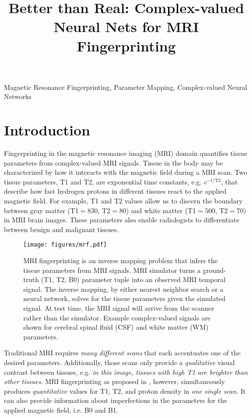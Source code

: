 \documentclass{article}
\title{Better than Real: Complex-valued Neural Nets for MRI Fingerprinting}
\begin{document}
\maketitle

\begin{abstract}

\end{abstract}

\begin{keywords}
Magnetic Resonance Fingerprinting, Parameter Mapping, 
Complex-valued Neural Networks
\end{keywords}

\section{Introduction}
\label{sec:intro}


Fingerprinting in the magnetic resonance imaging (MRI) domain \cite{mrf_nature} quantifies tissue parameters from complex-valued MRI signals. 
Tissue in the body may be characterized by how it interacts with the magnetic field during a MRI scan. Two tissue parameters, T1 and T2, are exponential time constants, e.g. $e^{-t/\text{T}2}$, that describe how fast hydrogen protons in different tissues react to the applied magnetic field. For example, T1 and T2 values allow us to discern the boundary between gray matter (T1$=830$, T2$=80$) and white matter (T1$=500$, T2$=70$) in MRI brain images. These parameters also enable radiologists to differentiate between benign and malignant tissues.

\begin{figure}[t]
	\texttt{[image: figures/mrf.pdf]}
	\label{fig:mrf}
	\caption{MRI fingerprinting is an inverse mapping problem that infers the tissue parameters from MRI signals. MRI simulator turns a ground-truth (T1, T2, B0) parameter tuple into an observed MRI temporal signal. The inverse mapping, by either nearest neighbor search or a neural network, solves for the tissue parameters given the simulated signal. At test time, the MRI signal will arrive from the scanner rather than the simulator.  Example complex-valued signals are shown for cerebral spinal fluid (CSF) and white matter (WM) parameters. }
\end{figure}

Traditional MRI requires {\it many different scans} that each accentuates one of the desired parameters. Additionally, those scans only provide a {\it qualitative} visual contrast between tissues, e.g. {\it in this image, tissues with high T1 are brighter than other tissues}. MRI fingerprinting as proposed in \cite{mrf_nature}, however, simultaneously produces {\it quantitative} values for T1, T2, and proton density in {\it one single scan}. It can also provide information about imperfections in the parameters for the applied  magnetic field, i.e. B0 and B1.
\end{document}

